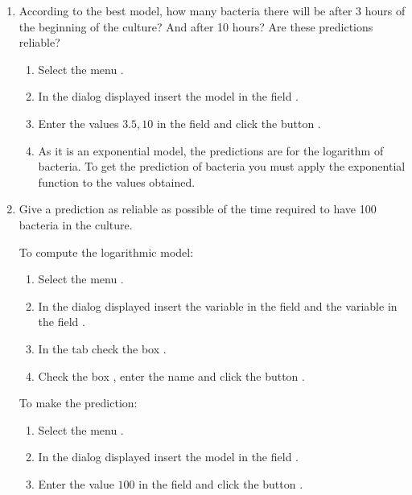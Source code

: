 \begin{enumerate}[leftmargin=*]
\begin{enumerate}
\item According to the best model, how many bacteria there will be after 3 hours of the beginning of the culture?
And after 10 hours?
Are these predictions reliable?
\begin{indication}
\begin{enumerate}
\item Select the menu .
\item In the dialog displayed insert the model  in the field
.
\item Enter the values $3.5, 10$ in the field  and click the button .
\item As it is an exponential model, the predictions are for the logarithm of bacteria. 
To get the prediction of bacteria you must apply the exponential function to the values obtained.
\end{enumerate}
\end{indication}

\item Give a prediction as reliable as possible of the time required to have 100 bacteria in the culture.
\begin{indication}
To compute the logarithmic model:
\begin{enumerate}
\item Select the menu .
\item In the dialog displayed insert the variable  in the field  and the
variable  in the field .
\item In the  tab check the box .
\item Check the box , enter the name  and click
the button .
\end{enumerate}
To make the prediction:
\begin{enumerate}
\item Select the menu .
\item In the dialog displayed insert the model  in the field
.
\item Enter the value $100$ in the field  and click the button .
\end{enumerate}
\end{indication}
\end{enumerate}



\end{enumerate}
